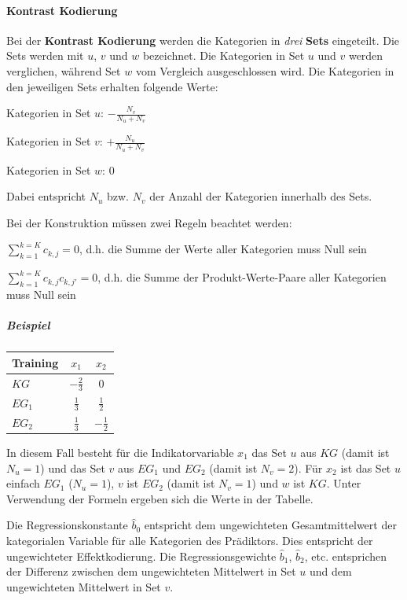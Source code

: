 \documentclass{article}
\numberwithin{equation}{section}
\begin{document}
\paragraph{Kontrast Kodierung}

Bei der \textbf{Kontrast Kodierung} werden die Kategorien in \emph{drei} \textbf{Sets} eingeteilt. Die Sets werden mit $u$, $v$ und $w$ bezeichnet. Die Kategorien in Set $u$ und $v$ werden verglichen, während Set $w$ vom Vergleich ausgeschlossen wird. Die Kategorien in den jeweiligen Sets erhalten folgende Werte:

\begin{compactitem}
\item Kategorien in Set $u$: $-\frac{N_v}{N_u +N_v}$
\item Kategorien in Set $v$: $+\frac{N_u}{N_u +N_v}$
\item Kategorien in Set $w$: $0$
\end{compactitem}

Dabei entspricht $N_u$ bzw. $N_v$ der Anzahl der Kategorien innerhalb des Sets.

Bei der Konstruktion müssen zwei Regeln beachtet werden:

\begin{compactitem}
\item $\sum_{k=1}^{k=K} c_{k,j} = 0$, d.h. die Summe der Werte aller Kategorien muss Null sein
\item $\sum_{k=1}^{k=K} c_{k,j} c_{k,j'} = 0$, d.h. die Summe der Produkt-Werte-Paare aller Kategorien muss Null sein
\end{compactitem}

\subparagraph{Beispiel}

\begin{tabular}{lcc}
Training & $x_1$ & $x_2$\\
\hline
$KG$ & $-\frac{2}{3}$ & $0$\\ 
$EG_1$ & $\frac{1}{3}$ & $\frac{1}{2}$\\
$EG_2$ & $\frac{1}{3}$ & $-\frac{1}{2}$
\end{tabular}

In diesem Fall besteht für die Indikatorvariable $x_1$ das Set $u$ aus $KG$ (damit ist $N_u = 1$) und das Set $v$ aus $EG_1$ und $EG_2$ (damit ist $N_v = 2$). Für $x_2$ ist das Set $u$ einfach $EG_1$ ($N_u = 1$), $v$ ist $EG_2$ (damit ist $N_v = 1$) und $w$ ist $KG$. Unter Verwendung der Formeln ergeben sich die Werte in der Tabelle.

Die Regressionskonstante $\hat b_0$ entspricht dem ungewichteten Gesamtmittelwert der kategorialen Variable für alle Kategorien des Prädiktors. Dies entspricht der ungewichteter Effektkodierung. Die Regressionsgewichte $\hat b_1$, $\hat b_2$, etc. entsprichen der Differenz zwischen dem ungewichteten Mittelwert in Set $u$ und dem
ungewichteten Mittelwert in Set $v$.
\end{document}
